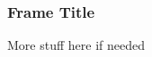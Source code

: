 \documentclass{beamer}
\begin{document}
\begin{frame}
    \frametitle{Frame Title}
    More stuff here if needed
\end{frame}




%	
\end{document}
